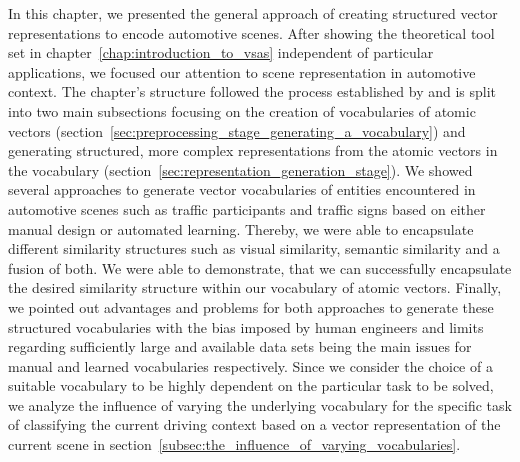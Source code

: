 In this chapter, we presented the general approach of creating structured vector representations to encode automotive scenes.
After showing the theoretical tool set in chapter~\ref{chap:introduction_to_vsas} independent of particular applications, we focused our attention to scene representation in automotive context.
The chapter's structure followed the process established by \textcite{Gallant2013} and is split into two main subsections focusing on the creation of vocabularies of atomic vectors (section~\ref{sec:preprocessing_stage_generating_a_vocabulary}) and generating structured, more complex representations from the atomic vectors in the vocabulary (section~\ref{sec:representation_generation_stage}).
We showed several approaches to generate vector vocabularies of entities encountered in automotive scenes such as traffic participants and traffic signs based on either manual design or automated learning.
Thereby, we were able to encapsulate different similarity structures such as visual similarity, semantic similarity and a fusion of both.
We were able to demonstrate, that we can successfully encapsulate the desired similarity structure within our vocabulary of atomic vectors.
Finally, we pointed out advantages and problems for both approaches to generate these structured vocabularies with the bias imposed by human engineers and limits regarding sufficiently large and available data sets being the main issues for manual and learned vocabularies respectively.
Since we consider the choice of a suitable vocabulary to be highly dependent on the particular task to be solved, we analyze the influence of varying the underlying vocabulary for the specific task of classifying the current driving context based on a vector representation of the current scene in section~\ref{subsec:the_influence_of_varying_vocabularies}.

